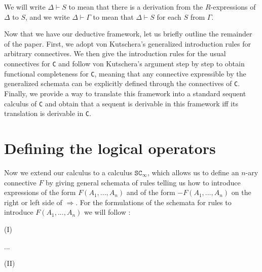 \documentclass{article}%
\theoremstyle{break}
\begin{document}
We will write $\Delta\vdash S$ to mean that there is a derivation from the $R$-expressions of $\Delta$ to $S$, and we write $\Delta\vdash \Gamma$ to mean that $\Delta\vdash S$ for each $S$ from $\Gamma$.

Now that we have our deductive framework, let us briefly outline the remainder of the paper.
First, we adopt von Kutschera's generalized introduction rules for arbitrary connectives.
We then give the introduction rules for the usual connectives for \texttt{C} and follow von Kutschera's argument step by step to obtain functional completeness for \texttt{C}, meaning that any connective expressible by the generalized schemata can be explicitly defined through the connectives of \texttt{C}.
Finally, we provide a way to translate this framework into a standard sequent calculus of \texttt{C} and obtain that a sequent is derivable in this framework iff its translation is derivable in \texttt{C}.




\section{Defining the logical operators}
Now we extend our calculus to a calculus $\texttt{SC}_\infty$, which allows us to define an $n$-ary connective $F$ by giving general schemata of rules telling us how to introduce expressions of the form $F(A_1,..., A_n)$ and of the form $-F(A_1,..., A_n)$ on the right or left side of $\Rightarrow$. 
For the formulations of the schemata for rules to introduce $F(A_1,..., A_n)$ we will follow \cite[p. 108]{Kutschera1969}:

\vspace{0.2cm}
(I)
\begin{center}
    
\quad {}\quad ... \quad {}

\end{center}

\vspace{0.2cm}
(II)
\begin{center}
    \quad {}
\end{center}
\end{document}
